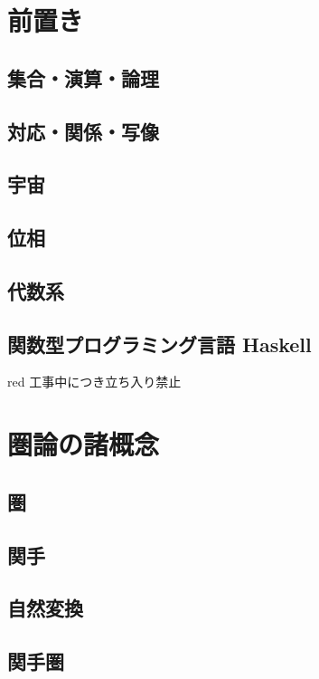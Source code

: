 \documentclass[dvipdfmx]{jsbook}
\theoremstyle{plain}
\begin{document}
\part{前置き}

\chapter{集合・演算・論理}

\chapter{対応・関係・写像}

\chapter{宇宙}

\chapter{位相}

\chapter{代数系}


\chapter{関数型プログラミング言語 Haskell}
\begin{color}{red}
工事中につき立ち入り禁止
\end{color}


\part{圏論の諸概念}
\chapter{圏}


\chapter{関手}


\chapter{自然変換}


\chapter{関手圏}

\end{document}

